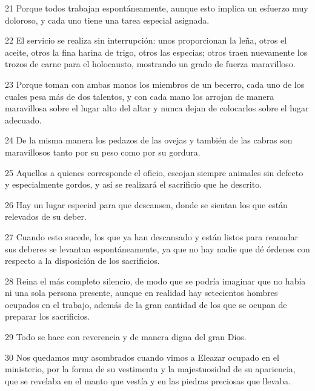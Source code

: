 \par 21 Porque todos trabajan espontáneamente, aunque esto implica un esfuerzo muy doloroso, y cada uno tiene una tarea especial asignada.

\par 22 El servicio se realiza sin interrupción: unos proporcionan la leña, otros el aceite, otros la fina harina de trigo, otros las especias; otros traen nuevamente los trozos de carne para el holocausto, mostrando un grado de fuerza maravilloso.

\par 23 Porque toman con ambas manos los miembros de un becerro, cada uno de los cuales pesa más de dos talentos, y con cada mano los arrojan de manera maravillosa sobre el lugar alto del altar y nunca dejan de colocarlos sobre el lugar adecuado.

\par 24 De la misma manera los pedazos de las ovejas y también de las cabras son maravillosos tanto por su peso como por su gordura.

\par 25 Aquellos a quienes corresponde el oficio, escojan siempre animales sin defecto y especialmente gordos, y así se realizará el sacrificio que he descrito.

\par 26 Hay un lugar especial para que descansen, donde se sientan los que están relevados de su deber.

\par 27 Cuando esto sucede, los que ya han descansado y están listos para reanudar sus deberes se levantan espontáneamente, ya que no hay nadie que dé órdenes con respecto a la disposición de los sacrificios.

\par 28 Reina el más completo silencio, de modo que se podría imaginar que no había ni una sola persona presente, aunque en realidad hay setecientos hombres ocupados en el trabajo, además de la gran cantidad de los que se ocupan de preparar los sacrificios.

\par 29 Todo se hace con reverencia y de manera digna del gran Dios.

\par 30 Nos quedamos muy asombrados cuando vimos a Eleazar ocupado en el ministerio, por la forma de su vestimenta y la majestuosidad de su apariencia, que se revelaba en el manto que vestía y en las piedras preciosas que llevaba.

